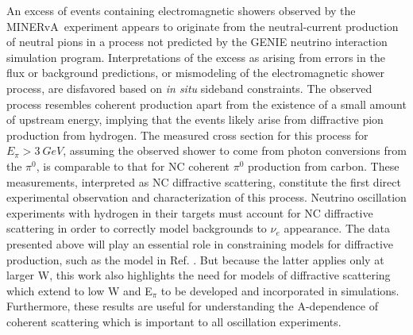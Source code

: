 \documentclass[%
preprint,
 amsmath,amssymb,
 aps,
]{revtex4-1}
\newcommand{\minerva}{\mbox{MINERvA}}
\newcommand{\nue}[0]{\nu_{e}}
\begin{document}
An excess of events containing electromagnetic showers observed by the \minerva\ experiment appears to originate from the neutral-current production of neutral pions in a process not predicted by the GENIE neutrino interaction simulation program.  Interpretations of the excess as arising from errors in the flux or background predictions, or mismodeling of the electromagnetic shower process, are disfavored based on \textit{in situ} sideband constraints.  The observed process resembles coherent production apart from the existence of a small amount of upstream energy, implying that the events likely arise from diffractive pion production from hydrogen.  The measured cross section  for this process for $E_{\pi}>3~GeV$, assuming the observed shower to come from photon conversions from the $\pi^{0}$, is comparable to that for NC coherent $\pi^{0}$ production from carbon.  These measurements, interpreted as NC diffractive scattering, constitute the first direct experimental observation and characterization of this process.  Neutrino oscillation experiments with hydrogen in their targets must account for NC diffractive scattering in order to correctly model backgrounds to $\nue$ appearance.  The data presented above will play an essential role in constraining models for diffractive production, such as the model in Ref. \cite{Rein1986}.  But because the latter applies only at larger W, this work also highlights the need for models of diffractive scattering which extend to low W and E$_{\pi}$ to be developed and incorporated in simulations.  
Furthermore, these results are useful for understanding the A-dependence of coherent scattering which is important to all oscillation experiments. 
\end{document}
